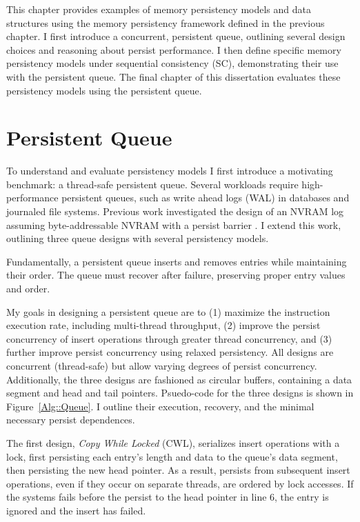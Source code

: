 This chapter provides examples of memory persistency models and data structures using the memory persistency framework defined in the previous chapter.
I first introduce a concurrent, persistent queue, outlining several design choices and reasoning about persist performance.
I then define specific memory persistency models under sequential consistency (SC), demonstrating their use with the persistent queue.
The final chapter of this dissertation evaluates these persistency models using the persistent queue.

\section{Persistent Queue}
\label{sec:PersistencyModels:Queue}

To understand and evaluate persistency models I first introduce a motivating benchmark: a thread-safe persistent queue.
Several workloads require high-performance persistent queues, such as write ahead logs (WAL) in databases and journaled file systems.
Previous work investigated the design of an NVRAM log assuming byte-addressable NVRAM with a persist barrier \cite{FangHsiao11}.
I extend this work, outlining three queue designs with several persistency models.

Fundamentally, a persistent queue inserts and removes entries while maintaining their order.
The queue must recover after failure, preserving proper entry values and order.

My goals in designing a persistent queue are to (1) maximize the instruction execution rate, including multi-thread throughput, (2) improve the persist concurrency of insert operations through greater thread concurrency, and (3) further improve persist concurrency using relaxed persistency.
All designs are concurrent (thread-safe) but allow varying degrees of persist concurrency.
Additionally, the three designs are fashioned as circular buffers, containing a data segment and head and tail pointers.
Psuedo-code for the three designs is shown in Figure~\ref{Alg::Queue}.
I outline their execution, recovery, and the minimal necessary persist dependences.



The first design, \emph{Copy While Locked} (CWL), serializes insert operations with a lock, first persisting each entry's length and data to the queue's data segment, then persisting the new head pointer.
As a result, persists from subsequent insert operations, even if they occur on separate threads, are ordered by lock accesses.
If the systems fails before the persist to the head pointer in line 6, the entry is ignored and the insert has failed.

